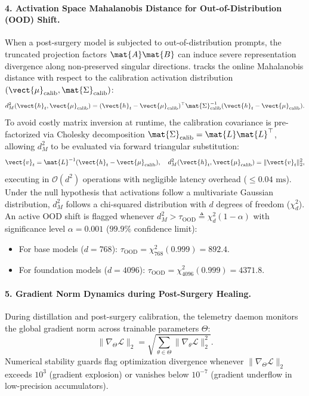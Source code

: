 \paragraph{4. Activation Space Mahalanobis Distance for Out-of-Distribution (OOD) Shift.}
When a post-surgery model is subjected to out-of-distribution prompts, the truncated projection factors $\mat{A}\mat{B}$ can induce severe representation divergence along non-preserved singular directions. \neuralops{} tracks the online Mahalanobis distance with respect to the calibration activation distribution $(\vect{\mu}_{\text{calib}}, \mat{\Sigma}_{\text{calib}})$:
\begin{equation}
\label{eq:mahalanobis_ood}
d_M^2(\vect{h}_t, \vect{\mu}_{\text{calib}}) = (\vect{h}_t - \vect{\mu}_{\text{calib}})^\top \mat{\Sigma}_{\text{calib}}^{-1} (\vect{h}_t - \vect{\mu}_{\text{calib}}).
\end{equation}
To avoid costly matrix inversion at runtime, the calibration covariance is pre-factorized via Cholesky decomposition $\mat{\Sigma}_{\text{calib}} = \mat{L}\mat{L}^\top$, allowing $d_M^2$ to be evaluated via forward triangular substitution:
\begin{equation}
\vect{v}_t = \mat{L}^{-1}(\vect{h}_t - \vect{\mu}_{\text{calib}}), \quad d_M^2(\vect{h}_t, \vect{\mu}_{\text{calib}}) = \|\vect{v}_t\|_2^2,
\end{equation}
executing in $\mathcal{O}(d^2)$ operations with negligible latency overhead ($\le 0.04\text{ ms}$). Under the null hypothesis that activations follow a multivariate Gaussian distribution, $d_M^2$ follows a chi-squared distribution with $d$ degrees of freedom ($\chi_d^2$). An active OOD shift is flagged whenever $d_M^2 > \tau_{\text{OOD}} \triangleq \chi_d^2(1 - \alpha)$ with significance level $\alpha = 0.001$ ($99.9\%$ confidence limit):
\begin{itemize}
    \item For base models ($d = 768$): $\tau_{\text{OOD}} = \chi_{768}^2(0.999) = \mathbf{892.4}$.
    \item For foundation models ($d = 4096$): $\tau_{\text{OOD}} = \chi_{4096}^2(0.999) = \mathbf{4371.8}$.
\end{itemize}

\paragraph{5. Gradient Norm Dynamics during Post-Surgery Healing.}
During distillation and post-surgery calibration, the telemetry daemon monitors the global gradient norm across trainable parameters $\Theta$:
\begin{equation}
\|\nabla_\Theta \mathcal{L}\|_2 = \sqrt{\sum_{\theta \in \Theta} \|\nabla_\theta \mathcal{L}\|_2^2}.
\end{equation}
Numerical stability guards flag optimization divergence whenever $\|\nabla_\Theta \mathcal{L}\|_2$ exceeds $10^3$ (gradient explosion) or vanishes below $10^{-7}$ (gradient underflow in low-precision accumulators).


